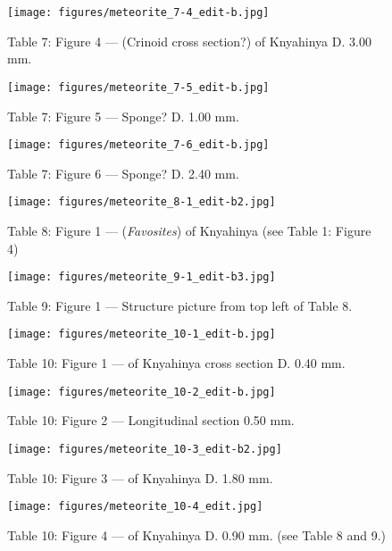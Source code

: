 \documentclass[a4paper, 12pt, oneside]{article}
\begin{document}
\clearpage
\begin{figure}[t]
\texttt{[image: figures/meteorite\_7-4\_edit-b.jpg]}
\caption{Table 7: Figure 4 --- (Crinoid cross section?) of Knyahinya D. 3.00 mm.}
\centering
\end{figure}
\clearpage
\begin{figure}[t]
\texttt{[image: figures/meteorite\_7-5\_edit-b.jpg]}
\caption{Table 7: Figure 5 --- Sponge? D. 1.00 mm.}
\centering
\end{figure}
\clearpage
\begin{figure}[t]
\texttt{[image: figures/meteorite\_7-6\_edit-b.jpg]}
\caption{Table 7: Figure 6 --- Sponge? D. 2.40 mm.}
\centering
\end{figure}
\clearpage
{}
\begin{figure}[t]
\texttt{[image: figures/meteorite\_8-1\_edit-b2.jpg]}
\caption{Table 8: Figure 1 --- (\emph{Favosites}) of Knyahinya (see Table 1: Figure 4)}
\centering
\end{figure}
\clearpage
\begin{figure}[t]
\texttt{[image: figures/meteorite\_9-1\_edit-b3.jpg]}
\caption{Table 9: Figure 1 --- Structure picture from top left of Table 8.}
\centering
\end{figure}
\clearpage
\begin{figure}[t]
\texttt{[image: figures/meteorite\_10-1\_edit-b.jpg]}
\caption{Table 10: Figure 1 --- of Knyahinya cross section D. 0.40 mm.}
\centering
\end{figure}
\clearpage
\begin{figure}[t]
\texttt{[image: figures/meteorite\_10-2\_edit-b.jpg]}
\caption{Table 10: Figure 2 --- Longitudinal section 0.50 mm.}
\centering
\end{figure}
\clearpage
\begin{figure}[t]
\texttt{[image: figures/meteorite\_10-3\_edit-b2.jpg]}
\caption{Table 10: Figure 3 --- of Knyahinya D. 1.80 mm.}
\centering
\end{figure}
\clearpage
\begin{figure}[t]
\texttt{[image: figures/meteorite\_10-4\_edit.jpg]}
\caption{Table 10: Figure 4 --- of Knyahinya D. 0.90 mm. (see Table 8 and 9.)}
\centering
\end{figure}
\end{document}
